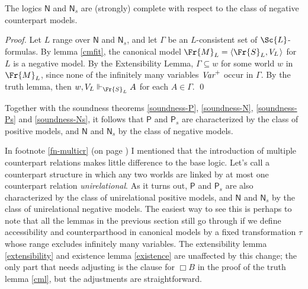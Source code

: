 \documentclass[11pt]{woarticle}
\theoremstyle{break}
\theoremstyle{nonumberplain}
\newcommand{\s}[1]{\ensuremath{\mathsf{#1}}}
\newcommand{\SAT}{\Vdash}
\newcommand{\1}{\;\,|\;\,}
\renewcommand{\t}[1]{\ensuremath{\langle #1  \makebox[.2ex]{}\rangle}}
\begin{document}
\begin{theorem}[Completeness of \s{N} and $\s{N}_s$]
  The logics \s{N} and $\s{N}_s$ are (strongly) complete with respect
  to the class of negative counterpart models.
\end{theorem}
\begin{proof}
  Let $L$ range over \s{N} and $\s{N}_s$, and let $\Gamma$ be an
  $L$-consistent set of $\Sc{L}$-formulas. By lemma \ref{cmfit}, the
  canonical model $\Fr{M}_L = \t{\Fr{S}_L, V_L}$ for $L$ is a negative
  model. By the Extensibility Lemma, $\Gamma \subseteq w$ for some
  world $w$ in $\Fr{M}_{L}$, since none of the infinitely many
  variables $\emph{Var}^+$ occur in $\Gamma$. By the truth lemma, then
  $w,V_L \SAT_{\Fr{S}_L} A$ for each $A \in \Gamma$. \qed
\end{proof}

Together with the soundness theorems \ref{soundness-P},
\ref{soundness-N}, \ref{soundness-Ps} and \ref{soundness-Ns}, it
follows that $\s{P}$ and $\s{P}_s$ are characterized by the class of
positive models, and $\s{N}$ and $\s{N}_s$ by the class of negative
models.

In footnote \ref{fn-multicr} (on page \pageref{fn-multicr}) I
mentioned that the introduction of multiple counterpart relations
makes little difference to the base logic. Let's call a counterpart
structure in which any two worlds are linked by at most one
counterpart relation \emph{unirelational}. As it turns out, $\s{P}$
and $\s{P}_s$ are also characterized by the class of unirelational
positive models, and $\s{N}$ and $\s{N}_s$ by the class of
unirelational negative models. The easiest way to see this is perhaps
to note that all the lemmas in the previous section still go through
if we define accessibility and counterparthood in canonical models by
a fixed transformation $\tau$ whose range excludes infinitely many
variables. The extensibility lemma \ref{extensibility} and existence
lemma \ref{existence} are unaffected by this change; the only part
that needs adjusting is the clause for $\Box B$ in the proof of the
truth lemma \ref{cml}, but the adjustments are straightforward.
\end{document}
